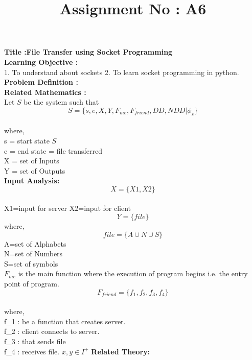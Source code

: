 \documentclass{article}
\title{Assignment No : A6}
\begin{document}
\maketitle

\noindent \textbf{\large Title :File Transfer using Socket Programming} \\[.75cm]
\textbf{\large Learning Objective : }\\	
\hspace*{5mm} 1. To understand about sockets	\newline
\hspace*{5mm} 2. To learn socket programming in python.	 \newline
\textbf{\large Problem Definition : }\\
\textbf{\large Related Mathematics :}\\
Let $S$ be the system such that\\
$$S=\lbrace s,e,X,Y,F_{me},F_{friend},DD,NDD |\phi_{s} \rbrace$$\\
where,\\
s = start state $S$\\
e = end state = file transferred\\
X = set of Inputs\\
Y = set of Outputs\\ 
\textbf{Input Analysis: }\\
$$X=\lbrace X1,X2 \rbrace$$\\
X1=input for server
X2=input for client
$$Y=\lbrace file \rbrace$$
where,\\
$$file=\lbrace A \cup N \cup S \rbrace$$
A=set of Alphabets \\
N=set of Numbers\\
S=set of symbols\\
$F_{me}$ is the main function where the execution of program begins i.e. the entry point of program.\\
$$F_{friend}=\lbrace f_1,f_2,f_3,f_4 \rbrace$$\\
where,\\
f_1 : be a function that creates server.\\
f_2 : client connects to server.\\
f_3 : that sends file\\
f_4 : receives file.
$x,y \in I^+ $\newpage
\textbf{\large Related Theory: }\\[.5cm]
\end{document}
